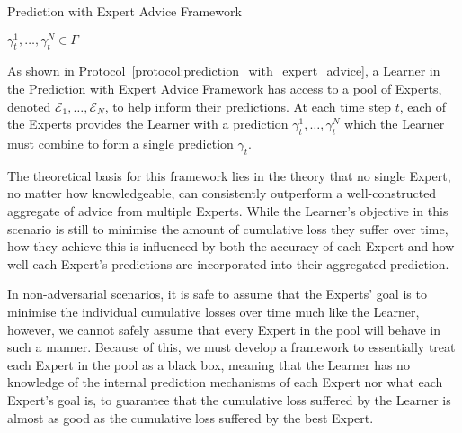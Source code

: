 \begin{protocol}[H]
    \caption{Prediction with Expert Advice Framework}\label{protocol:prediction_with_expert_advice}
    \begin{algorithmic}[1]
        $\gamma^1_t, \ldots, \gamma^N_t \in \Gamma$
    \end{algorithmic}
\end{protocol}

As shown in Protocol~\ref{protocol:prediction_with_expert_advice}, a Learner in the Prediction with Expert Advice Framework has access to a pool of Experts, denoted $\mathcal{E}_1, \ldots, \mathcal{E}_N$, to help inform their predictions. At each time step $t$, each of the Experts provides the Learner with a prediction $\gamma^1_t, \ldots, \gamma^N_t$ which the Learner must combine to form a single prediction $\gamma_t$.

The theoretical basis for this framework lies in the theory that no single Expert, no matter how knowledgeable, can consistently outperform a well-constructed aggregate of advice from multiple Experts. While the Learner's objective in this scenario is still to minimise the amount of cumulative loss they suffer over time, how they achieve this is influenced by both the accuracy of each Expert and how well each Expert's predictions are incorporated into their aggregated prediction.

In non-adversarial scenarios, it is safe to assume that the Experts' goal is to minimise the individual cumulative losses over time much like the Learner, however, we cannot safely assume that every Expert in the pool will behave in such a manner. Because of this, we must develop a framework to essentially treat each Expert in the pool as a black box, meaning that the Learner has no knowledge of the internal prediction mechanisms of each Expert nor what each Expert's goal is, to guarantee that the cumulative loss suffered by the Learner is almost as good as the cumulative loss suffered by the best Expert.

